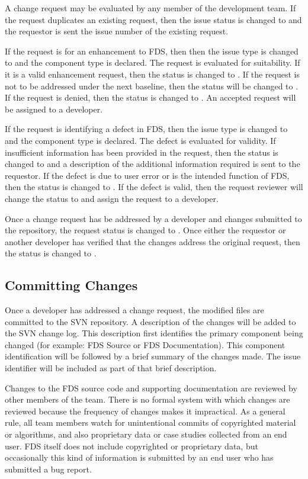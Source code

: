 \documentclass[11pt]{book}
\begin{document}
A change request may be evaluated by any member of the development team.
If the request duplicates an existing request, then the issue status is changed to  and the
requestor is sent the issue number of the existing request.

If the request is for an enhancement to FDS, then then the issue type is changed to  and the
component type is declared. The request is evaluated for suitability.  If it is a valid enhancement
request, then the status is changed to .  If the request is not to
be addressed under the next baseline, then the status will be changed to .  If the request is denied, then
the status is changed to .  An accepted request will be assigned to a developer.

If the request is identifying a defect in FDS, then the issue type is changed to  and the
component type is declared.  The defect is evaluated for validity.  If insufficient information has
been provided in the request, then the status is changed to  and a description of the additional
information required is sent to the requestor.  If the defect is due to user error or is the intended function of FDS,
then the status is changed to .  If the defect is valid, then the request reviewer will change the
status to  and assign the request to a developer.

Once a change request has be addressed by a developer and changes submitted to the repository, the request status
is changed to .  Once either the requestor or another developer has verified that the changes address
the original request, then the status is changed to .


\subsection{Committing Changes}

Once a developer has addressed a change request, the modified files are committed to the SVN repository.  A description
of the changes will be added to the SVN change log.  This description first identifies the primary component being
changed (for example: FDS Source or FDS Documentation).  This component identification will be followed by a brief
summary of the changes made.  The issue identifier will be included as part of that brief description.

Changes to the FDS source code and supporting documentation are reviewed by other members of the team. There is no formal system with which changes are reviewed because the frequency of changes makes it impractical. As a general rule, all team members watch for unintentional commits of copyrighted material or algorithms, and also proprietary data or case studies collected from an end user. FDS itself does not include copyrighted or proprietary data, but occasionally this kind of information is submitted by an end user who has submitted a bug report.
\end{document}
